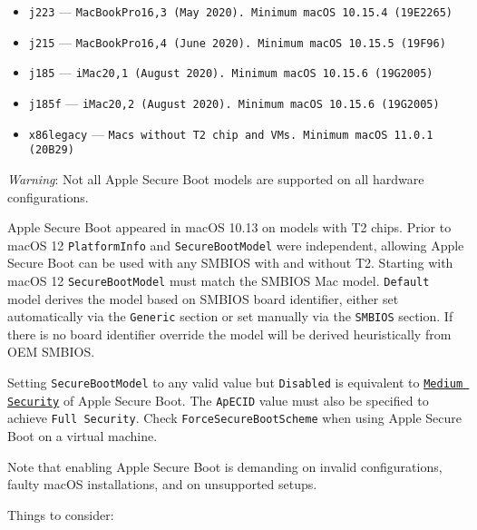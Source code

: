 \documentclass[]{article}
\begin{document}
\begin{enumerate}
\begin{itemize}
  \item \texttt{j223} --- \texttt{MacBookPro16,3 (May 2020). Minimum macOS 10.15.4 (19E2265)}
  \item \texttt{j215} --- \texttt{MacBookPro16,4 (June 2020). Minimum macOS 10.15.5 (19F96)}
  \item \texttt{j185} --- \texttt{iMac20,1 (August 2020). Minimum macOS 10.15.6 (19G2005)}
  \item \texttt{j185f} --- \texttt{iMac20,2 (August 2020). Minimum macOS 10.15.6 (19G2005)}
  \item \texttt{x86legacy} --- \texttt{Macs without T2 chip and VMs. Minimum macOS 11.0.1 (20B29)}
  \end{itemize}

  \emph{Warning}: Not all Apple Secure Boot models are supported on all hardware configurations.

  Apple Secure Boot appeared in macOS 10.13 on models with T2 chips.
  Prior to macOS 12 \texttt{PlatformInfo} and \texttt{SecureBootModel} were independent,
  allowing Apple Secure Boot can be used with any SMBIOS with and without T2.
  Starting with macOS 12 \texttt{SecureBootModel} must match the SMBIOS Mac model.
  \texttt{Default} model derives the model based on SMBIOS board identifier, either
  set automatically via the \texttt{Generic} section or set manually via the \texttt{SMBIOS} section.
  If there is no board identifier override the model will be derived heuristically from OEM SMBIOS.

  Setting \texttt{SecureBootModel} to any valid value but \texttt{Disabled}
  is equivalent to
  \href{https://support.apple.com/en-us/HT208330}{\texttt{Medium Security}}
  of Apple Secure Boot. The \texttt{ApECID} value must also be specified to
  achieve \texttt{Full Security}. Check \texttt{ForceSecureBootScheme}
  when using Apple Secure Boot on a virtual machine.

  Note that enabling Apple Secure Boot is demanding on invalid configurations,
  faulty macOS installations, and on unsupported setups.

  Things to consider:


\end{enumerate}
\end{document}
